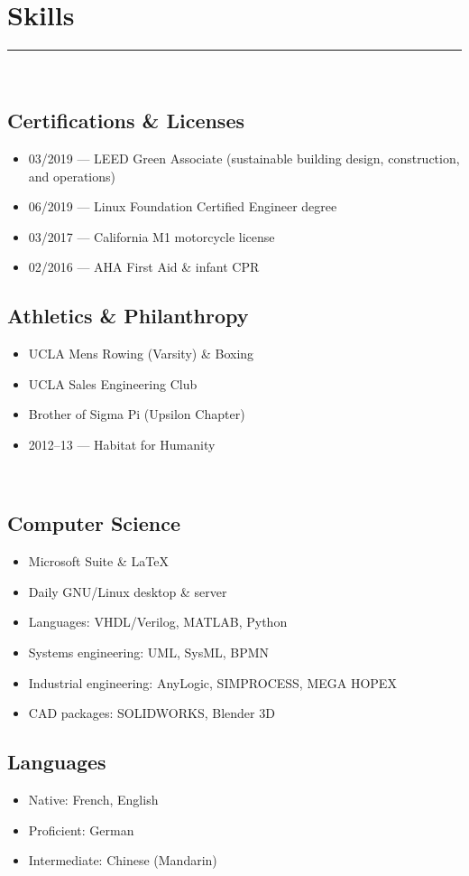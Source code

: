 \documentclass[10pt]{report}
\begin{document}
\section*{Skills}
\rule{\linewidth}{1pt}\\[0.2cm]
\begin{minipage}[t]{0.52\linewidth}
    \subsection*{Certifications \& Licenses}
    \begin{itemize}
        \item 03/2019 --- LEED Green Associate (sustainable building design, construction, and operations)
        \item 06/2019 --- Linux Foundation Certified Engineer degree
        \item 03/2017 --- California M1 motorcycle license
        \item 02/2016 --- AHA First Aid \& infant CPR
    \end{itemize}
    \subsection*{Athletics \& Philanthropy}
    \begin{itemize}
        \item UCLA Mens Rowing (Varsity) \& Boxing
        \item UCLA Sales Engineering Club
        \item Brother of Sigma Pi (Upsilon Chapter)
        \item 2012--13 --- Habitat for Humanity
    \end{itemize}
\end{minipage}
~
\begin{minipage}[t]{0.44\linewidth}
    \subsection*{Computer Science}
    \begin{itemize}
        \item Microsoft Suite \& \LaTeX
        \item Daily GNU/Linux desktop \& server
        \item Languages: VHDL/Verilog, MATLAB, Python
        \item Systems engineering: UML, SysML, BPMN
        \item Industrial engineering: AnyLogic, SIMPROCESS, MEGA HOPEX
        \item CAD packages: SOLIDWORKS, Blender 3D
    \end{itemize}
    \subsection*{Languages}
    \begin{itemize}
        \item Native: French, English
        \item Proficient: German
        \item Intermediate: Chinese (Mandarin)
    \end{itemize}
\end{minipage}
\end{document}
